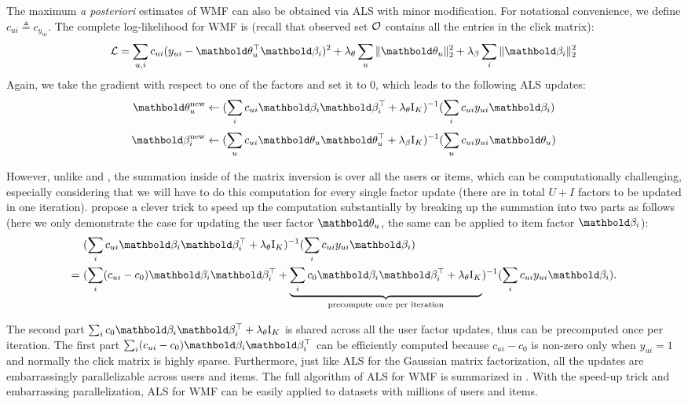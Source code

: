 The maximum \textit{a posteriori} estimates of \gls{WMF} can also be obtained via ALS with minor modification. For notational convenience, we define $c_{ui} \triangleq c_{y_{ui}}$. The complete log-likelihood for \gls{WMF} is (recall that observed set $\mathcal{O}$ contains all the entries in the click matrix):
\begin{equation*}
\cL = \sum_{u, i} c_{ui}(y_{ui} - \mb\theta_u^\top\mb\beta_i)^2 + \lambda_\theta \sum_u \|\mb\theta_u \|^2_2 + \lambda_\beta \sum_i \|\mb\beta_i \|_2^2
\end{equation*}
Again, we take the gradient with respect to one of the factors and set it to $0$, which leads to the following ALS updates:
\begin{equation}
\mb\theta_u^\new \leftarrow (\sum_i c_{ui} \mb\beta_i \mb\beta_i^\top + \lambda_\theta \mathrm{I}_K)^{-1} (\sum_i c_{ui} y_{ui} \mb\beta_i)
\label{chpt:background:eq:wals_user}
\end{equation}
\begin{equation}
\mb\beta_i^\new \leftarrow (\sum_u c_{ui} \mb\theta_u \mb\theta_u^\top + \lambda_\beta \mathrm{I}_K)^{-1} (\sum_u c_{ui} y_{ui} \mb\theta_u)
\label{chpt:background:eq:wals_item}
\end{equation}

However, unlike  and , the summation inside of the matrix inversion is over all the users or items, which can be computationally challenging, especially considering that we will have to do this computation for every single factor update (there are in total $U + I$ factors to be updated in one iteration). \citet{hu2008collaborative} propose a clever trick to speed up the computation substantially by breaking up the summation into two parts as follows (here we only demonstrate the case for updating the user factor $\mb\theta_u$, the same can be applied to item factor $\mb\beta_i$):
\begin{align*}
&(\sum_i c_{ui} \mb\beta_i \mb\beta_i^\top + \lambda_\theta \mathrm{I}_K)^{-1} (\sum_i c_{ui} y_{ui} \mb\beta_i)\\
=~& (\sum_i (c_{ui} - c_0) \mb\beta_i \mb\beta_i^\top + \underbrace{\sum_i c_0 \mb\beta_i \mb\beta_i^\top + \lambda_\theta \mathrm{I}_K}_{\textrm{precompute once per iteration}})^{-1} (\sum_i c_{ui} y_{ui} \mb\beta_i).
\end{align*}

The second part $\sum_i c_0 \mb\beta_i \mb\beta_i^\top + \lambda_\theta \mathrm{I}_K$ is shared across all the user factor updates, thus can be precomputed once per iteration. The first part $\sum_i (c_{ui} - c_0)\mb\beta_i\mb\beta_i^\top$ can be efficiently computed because $c_{ui} - c_0$ is non-zero only when $y_{ui} = 1$ and normally the click matrix is highly sparse. Furthermore, just like ALS for the Gaussian matrix factorization, all the updates are embarrassingly parallelizable across users and items. The full algorithm of ALS for \gls{WMF} is summarized in . With the speed-up trick and embarrassing parallelization, ALS for \gls{WMF} can be easily applied to datasets with millions of users and items. 

